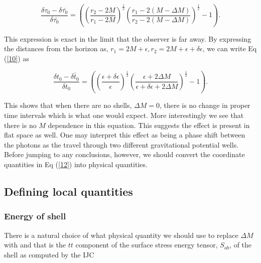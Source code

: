 \documentclass[aps,showpacs,twocolumn,floats,prd,superscriptaddress,nofootinbib]{revtex4-1}
\begin{document}
\begin{equation}
	 \frac{\delta \tau_0 - \delta \bar{\tau_0}}{\delta \bar{\tau_0}} = \left( \left( \frac{r_2 - 2M}{r_1 - 2M} \right)^\frac{1}{2} \left( \frac{r_1 - 2(M-\Delta M)}{r_2 - 2(M-\Delta M)} \right)^\frac{1}{2} - 1\right).	\label{10}
\end{equation}

This expression is exact in the limit that the observer is far away. By expressing the distances from the horizon as, $r_1  =  2M + \epsilon,  r_2  =  2M + \epsilon + \delta \epsilon$, we can write Eq (\ref{10}) as

\begin{equation}
	\frac{\delta t_0 - \bar{\delta t_0}}{\delta t_0} = \left( \left( \frac{\epsilon + \delta \epsilon}{\epsilon} \right)^\frac{1}{2} \left( \frac{\epsilon + 2 \Delta M}{\epsilon + \delta \epsilon + 2\Delta M} \right)^\frac{1}{2} - 1\right). \label{12}
\end{equation}

This shows that when there are no shells, $\Delta M = 0$, there is no change in proper time intervals which is what one would expect. More interestingly we see that there is no $M$ dependence in this equation. This suggests the effect is present in flat space as well. One may interpret this effect as being a phase shift between the photons as the travel through two different gravitational potential wells. Before jumping to any conclusions, however, we should convert the coordinate quantities in Eq (\ref{12}) into physical quantities. 
	
%
%

\subsection{Defining local quantities}

\subsubsection{Energy of shell}

There is a natural choice of what physical quantity we should use to replace $\Delta M$ with and that is the $tt$ component of the surface stress energy tensor, $S_{ab}$, of the shell as computed by the IJC
\end{document}
